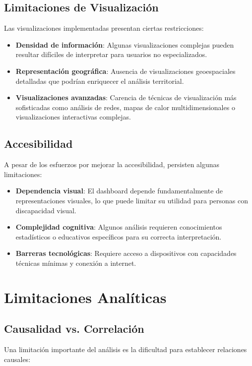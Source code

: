 \subsection{Limitaciones de Visualización}
Las visualizaciones implementadas presentan ciertas restricciones:

\begin{itemize}
    \item \textbf{Densidad de información}: Algunas visualizaciones complejas pueden resultar difíciles de interpretar para usuarios no especializados.
    
    \item \textbf{Representación geográfica}: Ausencia de visualizaciones geoespaciales detalladas que podrían enriquecer el análisis territorial.
    
    \item \textbf{Visualizaciones avanzadas}: Carencia de técnicas de visualización más sofisticadas como análisis de redes, mapas de calor multidimensionales o visualizaciones interactivas complejas.
\end{itemize}

\subsection{Accesibilidad}
A pesar de los esfuerzos por mejorar la accesibilidad, persisten algunas limitaciones:

\begin{itemize}
    \item \textbf{Dependencia visual}: El dashboard depende fundamentalmente de representaciones visuales, lo que puede limitar su utilidad para personas con discapacidad visual.
    
    \item \textbf{Complejidad cognitiva}: Algunos análisis requieren conocimientos estadísticos o educativos específicos para su correcta interpretación.
    
    \item \textbf{Barreras tecnológicas}: Requiere acceso a dispositivos con capacidades técnicas mínimas y conexión a internet.
\end{itemize}

\section{Limitaciones Analíticas}

\subsection{Causalidad vs. Correlación}
Una limitación importante del análisis es la dificultad para establecer relaciones causales:

